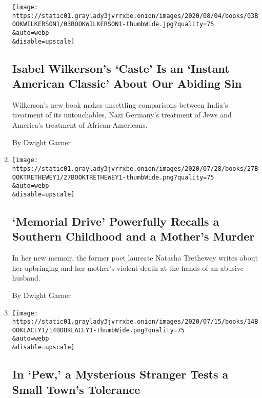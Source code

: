 \begin{enumerate}
  \texttt{[image: https://static01.graylady3jvrrxbe.onion/images/2020/08/04/books/03BOOKWILKERSON1/03BOOKWILKERSON1-thumbWide.jpg?quality=75\\\&auto=webp\\\&disable=upscale]}

  \hypertarget{isabel-wilkersons-caste-is-an-instant-american-classic-about-our-abiding-sin}{%
  \subsection{Isabel Wilkerson's `Caste' Is an `Instant American
  Classic' About Our Abiding
  Sin}\label{isabel-wilkersons-caste-is-an-instant-american-classic-about-our-abiding-sin}}

  Wilkerson's new book makes unsettling comparisons between India's
  treatment of its untouchables, Nazi Germany's treatment of Jews and
  America's treatment of African-Americans.

  By Dwight Garner
\item
  \href{/2020/07/27/books/review-memorial-drive-memoir-natasha-trethewey.html}{}

  \texttt{[image: https://static01.graylady3jvrrxbe.onion/images/2020/07/28/books/27BOOKTRETHEWEY1/27BOOKTRETHEWEY1-thumbWide.png?quality=75\\\&auto=webp\\\&disable=upscale]}

  \hypertarget{memorial-drive-powerfully-recalls-a-southern-childhood-and-a-mothers-murder}{%
  \subsection{`Memorial Drive' Powerfully Recalls a Southern Childhood
  and a Mother's
  Murder}\label{memorial-drive-powerfully-recalls-a-southern-childhood-and-a-mothers-murder}}

  In her new memoir, the former poet laureate Natasha Trethewey writes
  about her upbringing and her mother's violent death at the hands of an
  abusive husband.

  By Dwight Garner
\item
  \href{/2020/07/13/books/review-pew-catherine-lacey.html}{}

  \texttt{[image: https://static01.graylady3jvrrxbe.onion/images/2020/07/15/books/14BOOKLACEY1/14BOOKLACEY1-thumbWide.png?quality=75\\\&auto=webp\\\&disable=upscale]}

  \hypertarget{in-pew-a-mysterious-stranger-tests-a-small-towns-tolerance}{%
  \subsection{In `Pew,' a Mysterious Stranger Tests a Small Town's
  Tolerance}\label{in-pew-a-mysterious-stranger-tests-a-small-towns-tolerance}}


\end{enumerate}
